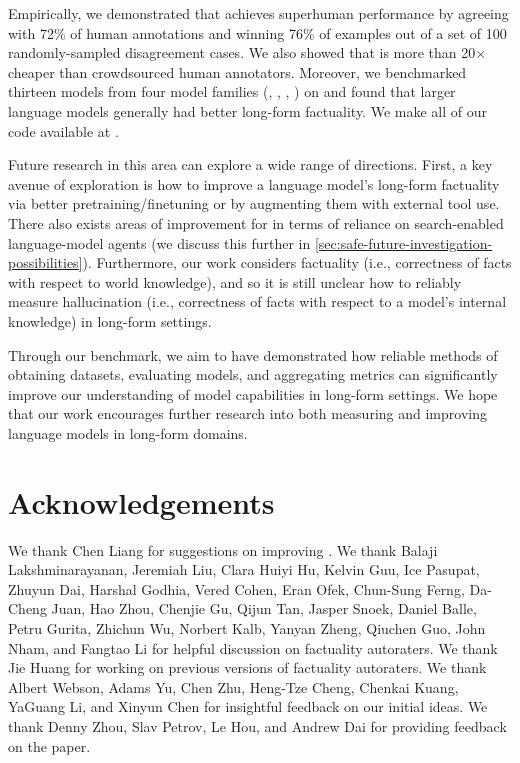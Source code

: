 \documentclass{article}
\theoremstyle{plain}
\theoremstyle{definition}
\theoremstyle{remark}
\begin{document}
Empirically, we demonstrated that \safe{} achieves superhuman performance by agreeing with 72\% of human annotations and winning 76\% of examples out of a set of 100 randomly-sampled disagreement cases.
We also showed that \safe{} is more than 20$\times$ cheaper than crowdsourced human annotators.
Moreover, we benchmarked thirteen models from four model families (\gemini{}, \gpt{}, \claude{}, \ulm{}) on \longfact{} and found that larger language models generally had better long-form factuality.
We make all of our code available at \githuburl{}.

Future research in this area can explore a wide range of directions.
First, a key avenue of exploration is how to improve a language model's long-form factuality via better pretraining/finetuning or by augmenting them with external tool use.
There also exists areas of improvement for \safe{} in terms of reliance on search-enabled language-model agents (we discuss this further in \cref{sec:safe-future-investigation-possibilities}).
Furthermore, our work considers factuality (i.e., correctness of facts with respect to world knowledge), and so it is still unclear how to reliably measure hallucination (i.e., correctness of facts with respect to a model's internal knowledge) in long-form settings.

Through our benchmark, we aim to have demonstrated how reliable methods of obtaining datasets, evaluating models, and aggregating metrics can significantly improve our understanding of model capabilities in long-form settings.
We hope that our work encourages further research into both measuring and improving language models in long-form domains.

\clearpage
\section*{Acknowledgements}
\label{sec:acknolwedgements}
We thank Chen Liang for suggestions on improving \longfact{}.
We thank Balaji Lakshminarayanan, Jeremiah Liu, Clara Huiyi Hu, Kelvin Guu, Ice Pasupat, Zhuyun Dai, Harshal Godhia, Vered Cohen, Eran Ofek, Chun-Sung Ferng, Da-Cheng Juan, Hao Zhou, Chenjie Gu, Qijun Tan, Jasper Snoek, Daniel Balle, Petru Gurita, Zhichun Wu, Norbert Kalb, Yanyan Zheng, Qiuchen Guo, John Nham, and Fangtao Li for helpful discussion on factuality autoraters.
We thank Jie Huang for working on previous versions of factuality autoraters.
We thank Albert Webson, Adams Yu, Chen Zhu, Heng-Tze Cheng, Chenkai Kuang, YaGuang Li, and Xinyun Chen for insightful feedback on our initial ideas.
We thank Denny Zhou, Slav Petrov, Le Hou, and Andrew Dai for providing feedback on the paper.
\end{document}
